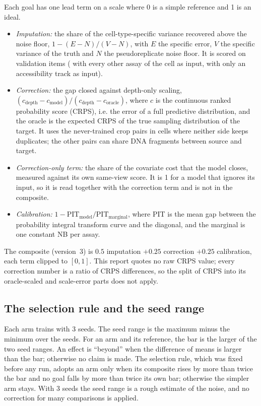 \documentclass[pdflatex,sn-mathphys-num]{sn-jnl}
\newcommand{\lit}[1]{#1}
\newcommand{\cl}[1]{#1}
\begin{document}
\cl{Each goal has one lead term on a scale where \lit{0} is a simple reference and \lit{1} is an ideal.}
\begin{itemize}
\item \cl{\textit{Imputation:} the share of the cell-type-specific variance recovered above the noise floor, $\lit{1} - (E - N)/(V - N)$, with $E$ the specific error, $V$ the specific variance of the truth and $N$ the pseudoreplicate noise floor. It is scored on \nItems{} validation items (\nItemsLoao{} with every other assay of the cell as input, \nItemsAcc{} with only an accessibility track as input).}
\item \cl{\textit{Correction:} the gap closed against depth-only scaling, $(c_{\text{depth}} - c_{\text{model}})/(c_{\text{depth}} - c_{\text{oracle}})$, where $c$ is the continuous ranked probability score (CRPS), i.e. the error of a full predictive distribution, and the oracle is the expected CRPS of the true sampling distribution of the target. It uses the \nCleanPairs{} never-trained crop pairs in \nCleanCells{} cells where neither side keeps duplicates; the other \nDupPairs{} pairs can share DNA fragments between source and target.}
\item \cl{\textit{Correction-only term:} the share of the covariate cost that the model closes, measured against its own same-view score. It is \lit{1} for a model that ignores its input, so it is read together with the correction term and is not in the composite.}
\item \cl{\textit{Calibration:} $\lit{1} - \text{PIT}_{\text{model}}/\text{PIT}_{\text{marginal}}$, where PIT is the mean gap between the probability integral transform curve and the diagonal, and the marginal is one constant NB per assay.}
\end{itemize}
\cl{The composite (version~\lit{3}) is $\lit{0.5}$ imputation $+ \lit{0.25}$ correction $+ \lit{0.25}$ calibration, each term clipped to $[\lit{0}, \lit{1}]$. This report quotes no raw CRPS value; every correction number is a ratio of CRPS differences, so the split of CRPS into its oracle-scaled and scale-error parts does not apply.}

\subsection{The selection rule and the seed range}

\cl{Each arm trains with \lit{3} seeds. The seed range is the maximum minus the minimum over the seeds. For an arm and its reference, the bar is the larger of the two seed ranges. An effect is ``beyond'' when the difference of means is larger than the bar; otherwise no claim is made. The selection rule, which was fixed before any run, adopts an arm only when its composite rises by more than twice the bar and no goal falls by more than twice its own bar; otherwise the simpler arm stays. With \lit{3} seeds the seed range is a rough estimate of the noise, and no correction for many comparisons is applied.}
\end{document}
